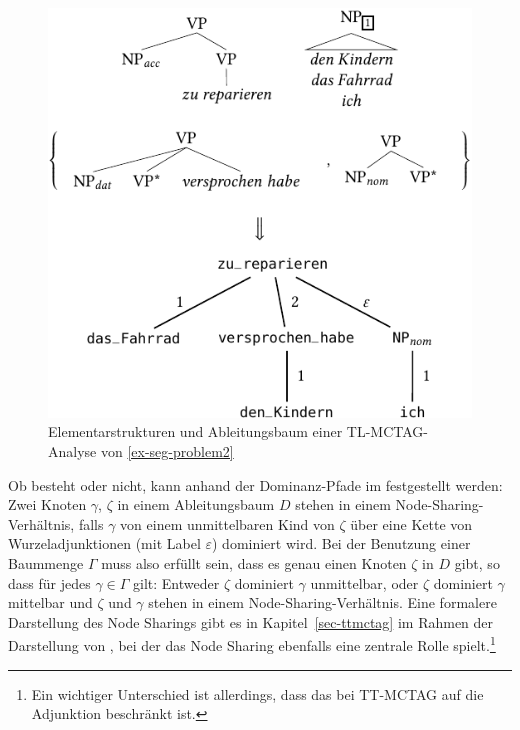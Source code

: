 \begin{figure}[t]
\centering
\includegraphics{graphics/abb616.pdf}
\caption{Elementarstrukturen und Ableitungsbaum einer TL-MCTAG-Analyse von \ref{ex-seg-problem2}\label{fig-snmctag-2}}
\end{figure}

Ob  besteht oder nicht, kann anhand der Dominanz-Pfade im festgestellt werden: Zwei Knoten $\gamma$, $\zeta$ in einem Ableitungsbaum $D$ stehen in einem Node-Sharing-Verhältnis, falls $\gamma$ von einem unmittelbaren Kind von $\zeta$ über eine Kette von Wurzeladjunktionen (mit Label $\varepsilon$) dominiert wird. Bei der Benutzung einer Baummenge $\Gamma$ muss also erfüllt sein, dass es genau einen Knoten $\zeta$ in $D$ gibt, so dass für jedes $\gamma \in \Gamma$ gilt: Entweder $\zeta$ dominiert $\gamma$ unmittelbar, oder $\zeta$ dominiert $\gamma$ mittelbar und $\zeta$ und $\gamma$ stehen in einem Node-Sharing-Verhältnis. Eine formalere Darstellung des Node Sharings gibt es in Kapitel~\ref{sec-ttmctag} im Rahmen der Darstellung von , bei der das Node Sharing ebenfalls eine zentrale Rolle spielt.\footnote{Ein wichtiger Unterschied ist allerdings, dass das  bei TT-MCTAG auf die Adjunktion beschränkt ist.} 

